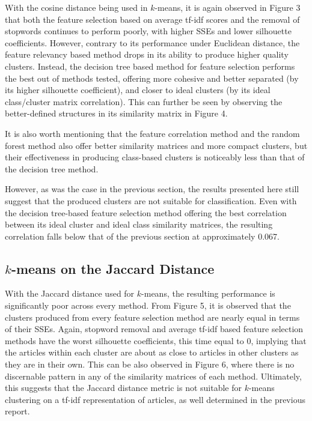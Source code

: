 \documentclass[11pt]{article}
\begin{document}
With the cosine distance being used in $k$-means, it is again observed in Figure 3 that both the feature selection based on average tf-idf scores and the removal of stopwords continues to perform poorly, with higher SSEs and lower silhouette coefficients.
However, contrary to its performance under Euclidean distance, the feature relevancy based method drops in its ability to produce higher quality clusters.
Instead, the decision tree based method for feature selection performs the best out of methods tested, offering more cohesive and better separated (by its higher silhouette coefficient), and closer to ideal clusters (by its ideal class/cluster matrix correlation).
This can further be seen by observing the better-defined structures in its similarity matrix in Figure 4.

It is also worth mentioning that the feature correlation method and the random forest method also offer better similarity matrices and more compact clusters, but their effectiveness in producing class-based clusters is noticeably less than that of the decision tree method.

However, as was the case in the previous section, the results presented here still suggest that the produced clusters are not suitable for classification.
Even with the decision tree-based feature selection method offering the best correlation between its ideal cluster and ideal class similarity matrices, the resulting correlation falls below that of the previous section at approximately 0.067.


\subsection{$k$-means on the Jaccard Distance}

With the Jaccard distance used for $k$-means, the resulting performance is significantly poor across every method.
From Figure 5, it is observed that the clusters produced from every feature selection method are nearly equal in terms of their SSEs.
Again, stopword removal and average tf-idf based feature selection methods have the worst silhouette coefficients, this time equal to 0, implying that the articles within each cluster are about as close to articles in other clusters as they are in their own.
This can be also observed in Figure 6, where there is no discernable pattern in any of the similarity matrices of each method.
Ultimately, this suggests that the Jaccard distance metric is not suitable for $k$-means clustering on a tf-idf representation of articles, as well determined in the previous report.
\end{document}
